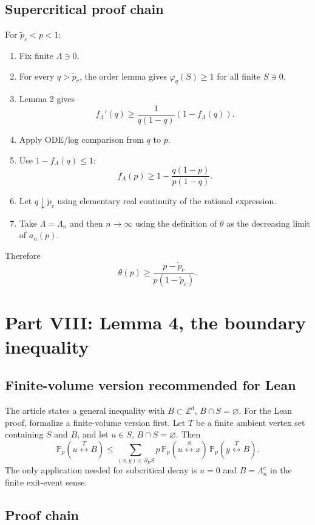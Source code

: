 \documentclass[11pt]{article}
\newcommand{\Z}{\mathbb Z}
\newcommand{\PP}{\mathbb P}
\newcommand{\conn}{\longleftrightarrow}
\newcommand{\ptilde}{\widetilde p_c}
\newcommand{\Lam}{\Lambda}
\newcommand{\dE}{\partial_E}
\theoremstyle{definition}
\theoremstyle{plain}
\begin{document}
\subsection{Supercritical proof chain}

For $\ptilde<p<1$:
\begin{enumerate}[leftmargin=1.4em]
  \item Fix finite $\Lam\ni0$.
  \item For every $q>\ptilde$, the order lemma gives $\varphi_q(S)\ge1$ for all finite $S\ni0$.
  \item Lemma 2 gives
  \[
    f_\Lam'(q)
    \ge \frac{1}{q(1-q)}(1-f_\Lam(q)).
  \]
  \item Apply ODE/log comparison from $q$ to $p$.
  \item Use $1-f_\Lam(q)\le1$:
  \[
    f_\Lam(p)
    \ge 1-\frac{q(1-p)}{p(1-q)}.
  \]
  \item Let $q\downarrow\ptilde$ using elementary real continuity of the rational expression.
  \item Take $\Lam=\Lam_n$ and then $n\to\infty$ using the definition of $\theta$ as the decreasing limit of $a_n(p)$.
\end{enumerate}
Therefore
\[
  \theta(p)
  \ge
  \frac{p-\ptilde}{p(1-\ptilde)}.
\]

\section{Part VIII: Lemma 4, the boundary inequality}

\subsection{Finite-volume version recommended for Lean}

The article states a general inequality with $B\subset\Z^d$, $B\cap S=\varnothing$.  For the Lean proof, formalize a finite-volume version first.  Let $T$ be a finite ambient vertex set containing $S$ and $B$, and let $u\in S$, $B\cap S=\varnothing$.  Then
\[
  \PP_p(u\stackrel{T}{\conn}B)
  \le
  \sum_{(x,y)\in\dE S}
  p\,\PP_p(u\stackrel S\conn x)\,
  \PP_p(y\stackrel{T}{\conn}B).
\]
The only application needed for subcritical decay is $u=0$ and $B=\Lam_n^c$ in the finite exit-event sense.

\subsection{Proof chain}
\end{document}
